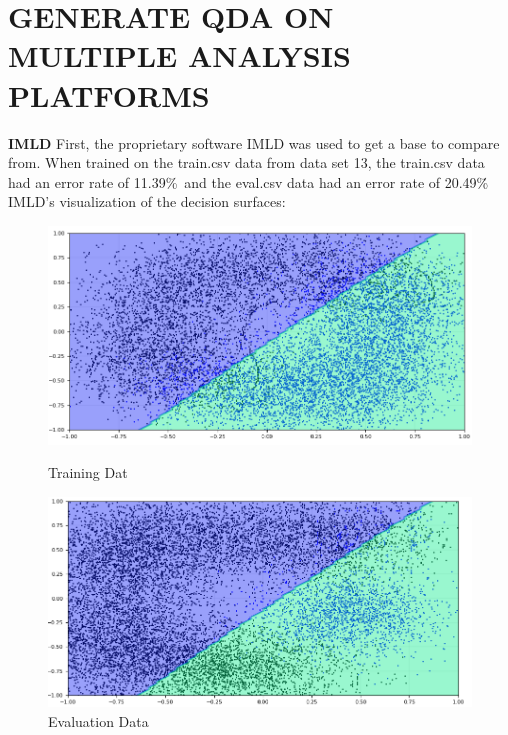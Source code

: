 \documentclass{article}
\begin{document}
\section{\MakeUppercase{Generate QDA on multiple analysis platforms}}
\begin{flushleft}
\textbf{IMLD}\break
\break
First, the proprietary software IMLD was used to get a base to compare from. When trained on the train.csv data from data set 13, the train.csv data had an error rate of 11.39\%\, and the eval.csv data had an error rate of 20.49\%\. \break
\break
IMLD's visualization of the decision surfaces:\break
\begin{figure}[!htb]
        \centering
        \begin{minipage}{0.49\textwidth}
                \centering
                \includegraphics[width=1\linewidth]{../IMLDTrain.png}
                \caption{Training Dat}
        \end{minipage}
        \begin{minipage}{0.49\textwidth}
                \centering
                \includegraphics[width=1\linewidth]{../IMLDEval.png}
                \caption{Evaluation Data}
        \end{minipage}
\end{figure}

\end{flushleft}
\end{document}
